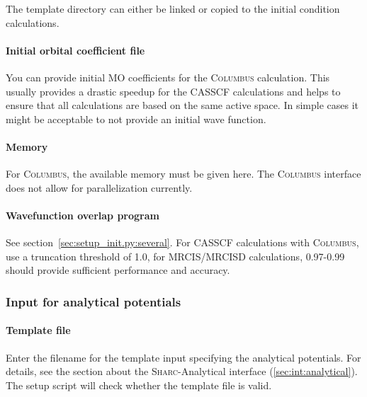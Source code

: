 \documentclass[a4paper,10pt,DIV=15,openany,twoside=false]{scrbook}
\newcommand{\sharc}{\textsc{Sharc}}
\begin{document}
The template directory can either be linked or copied to the initial condition calculations.

\paragraph{Initial orbital coefficient file}

You can provide initial MO coefficients for the \textsc{Columbus} calculation. This usually provides a drastic speedup for the CASSCF calculations and helps to ensure that all calculations are based on the same active space. In simple cases it might be acceptable to not provide an initial wave function.

\paragraph{Memory}

For \textsc{Columbus}, the available memory must be given here. The \textsc{Columbus} interface does not allow for parallelization currently.

\paragraph{Wavefunction overlap program}

See section~\ref{sec:setup_init.py:several}. For CASSCF calculations with \textsc{Columbus}, use a truncation threshold of 1.0, for MRCIS/MRCISD calculations, 0.97-0.99 should provide sufficient performance and accuracy.


\subsubsection{Input for analytical potentials}\label{sec:setup_init.py:analytical}

\paragraph{Template file}

Enter the filename for the template input specifying the analytical potentials. For details, see the section about the \sharc-Analytical interface (\ref{sec:int:analytical}). The setup script will check whether the template file is valid. 

\end{document}
